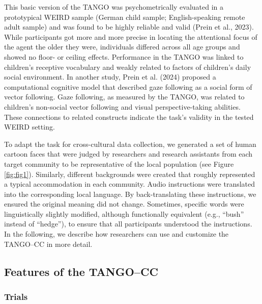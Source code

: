 \documentclass[
  man,floatsintext]{apa7}
\begin{document}
This basic version of the TANGO was psychometrically evaluated in a prototypical WEIRD sample (German child sample; English-speaking remote adult sample) and was found to be highly reliable and valid (Prein et al., 2023).
While participants got more and more precise in locating the attentional focus of the agent the older they were, individuals differed across all age groups and showed no floor- or ceiling effects.
Performance in the TANGO was linked to children's receptive vocabulary and weakly related to factors of children's daily social environment.
In another study, Prein et al. (2024) proposed a computational cognitive model that described gaze following as a social form of vector following.
Gaze following, as measured by the TANGO, was related to children's non-social vector following and visual perspective-taking abilities.
These connections to related constructs indicate the task's validity in the tested WEIRD setting.

To adapt the task for cross-cultural data collection, we generated a set of human cartoon faces that were judged by researchers and research assistants from each target community to be representative of the local population (see Figure \ref{fig:fig1}).
Similarly, different backgrounds were created that roughly represented a typical accommodation in each community.
Audio instructions were translated into the corresponding local language.
By back-translating these instructions, we ensured the original meaning did not change.
Sometimes, specific words were linguistically slightly modified, although functionally equivalent (e.g., ``bush'' instead of ``hedge''), to ensure that all participants understood the instructions.
In the following, we describe how researchers can use and customize the TANGO--CC in more detail.

\subsection{Features of the TANGO--CC}\label{features-of-the-tangocc}

\subsubsection{Trials}\label{trials}
\end{document}
